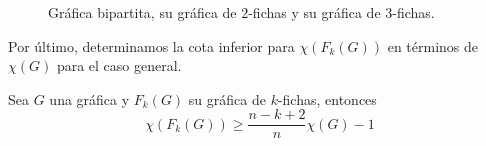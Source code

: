 \begin{figure}[ht!]
\caption{Gr\'afica bipartita, su gr\'afica de $2$-fichas y su gr\'afica de $3$-fichas.}
\label{fig:ex-bip}
\end{figure}

\pagebreak

Por \'ultimo, determinamos la cota inferior para $\chi (F_k(G))$ en t\'erminos de $\chi (G)$
para el caso general.

\begin{teorema}
\label{teo:numCrom-k}
    Sea $G$ una gr\'afica y $F_k(G)$ su gr\'afica de $k$-fichas, entonces
    \[
        \chi(F_k(G)) \geq \frac{n-k+2}{n} \chi(G) -1
    \]
\end{teorema}
        

